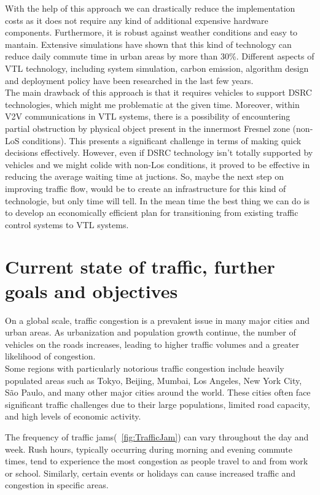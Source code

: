 \documentclass[17pt]{report}
\begin{document}
\indent \indent
With the help of this approach we can drastically reduce
the implementation costs as it does not require any kind of additional
expensive hardware components. Furthermore, it is robust against weather conditions
and easy to mantain. Extensive simulations have shown that this kind
of technology can reduce daily commute time in urban areas by more than 30\%.
Different aspects of VTL technology, including system simulation, carbon
emission, algorithm design and deployment policy have been researched in the
last few years. \cite{Neudecker2012}\\
\indent \indent
The main drawback of this approach is that it requires vehicles
to support DSRC technologies, which might me problematic at the given time.
Moreover, within V2V communications in VTL systems, there is a possibility of
encountering partial obstruction by physical object present in the innermost
Fresnel zone (non-LoS conditions). This presents a significant challenge in terms
of making quick decisions effectively. However, even if DSRC
technology isn't totally supported by vehicles and we might colide with non-Los
conditions, it proved to be effective in reducing the average waiting time at
juctions. So, maybe the next step on improving traffic flow, would be to create
an infrastructure for this kind of technologie, but only time will tell. In the mean
time the best thing we can do is to develop an economically efficient plan for
transitioning from existing traffic control systems to  VTL systems.

\pagebreak
\chapter{Current state of traffic, further goals and objectives}
\indent \indent
On a global scale, traffic congestion is a prevalent issue in many
major cities and urban areas. As urbanization and population growth
continue, the number of vehicles on the roads increases, leading to
higher traffic volumes and a greater likelihood of congestion.\\
\indent
Some regions with particularly notorious traffic congestion include
heavily populated areas such as Tokyo, Beijing, Mumbai, Los Angeles,
New York City, São Paulo, and many other major cities around the world.
These cities often face significant traffic challenges due to their large populations, limited road capacity, and high levels of economic activity.

The frequency of traffic jams(~\ref{fig:TrafficJam}) 
can vary throughout the day and week.
Rush hours, typically occurring during morning and evening commute
times, tend to experience the most congestion as people travel to
and from work or school. Similarly, certain events or holidays can
cause increased traffic and congestion in specific areas.
\end{document}
